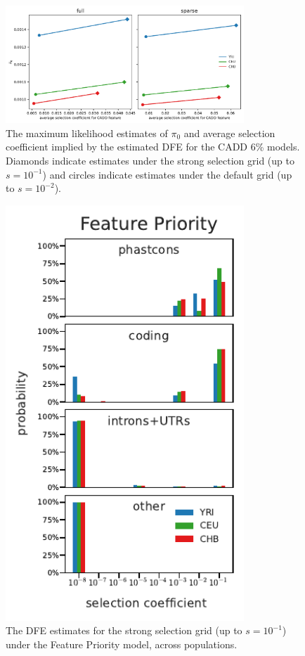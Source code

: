 \documentclass[11pt]{article}
\begin{document}
\begin{figure}[htbp]
  \centering
  \includegraphics[width=0.8\textwidth]{figures/supplementary/ave_sel_vs_pi0.pdf}

  \caption{The maximum likelihood estimates of $\pi_0$ and average selection
  coefficient implied by the estimated DFE for the CADD 6\% models. Diamonds
indicate estimates under the strong selection grid (up to $s=10^{-1}$) and
circles indicate estimates under the default grid (up to $s=10^{-2}$).}

    \label{suppfig:sel-ident}
\end{figure}

\begin{figure}[htbp]
  \centering
  \includegraphics[width=0.8\textwidth]{figures/supplementary/feature_priority_pop_dfe_strongselgrid.pdf}

  \caption{The DFE estimates for the strong selection grid (up to $s=10^{-1}$)
  under the Feature Priority model, across populations.}

    \label{suppfig:strong-sel-dfe-pop-phastcons}
\end{figure}
\end{document}
